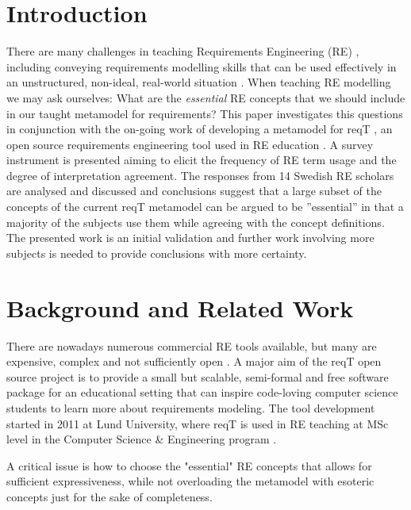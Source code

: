 \documentclass[a4paper]{llncs}
\begin{document}
\section{Introduction}
There are many challenges in teaching Requirements Engineering (RE) \cite{Memon2010, Regev2011}, including  conveying requirements modelling skills that can be used effectively in an unstructured, non-ideal, real-world situation \cite{Callele2006}. When teaching RE modelling we may ask ourselves: What are the \textit{essential} RE concepts that we should include in our taught metamodel for requirements? This paper investigates this questions in conjunction with the on-going work of developing a metamodel for reqT \cite{reqT}, an open source requirements engineering tool \cite{Regnell2013} used in RE education \cite{ets170}.
A survey instrument is presented aiming to elicit the frequency of RE term usage and the degree of interpretation agreement. The responses from 14 Swedish RE scholars are analysed and discussed and conclusions suggest that a large subset of the concepts of the current reqT metamodel can be argued to be ''essential'' in that a majority of the subjects use them while agreeing with the concept definitions. The presented work is an initial validation and further work involving more subjects is needed to provide conclusions with more certainty. 

\section{Background and Related Work}

There are nowadays numerous commercial RE tools available, but many are expensive, complex and not sufficiently open  \cite{Carillo2011}. A major aim of the reqT open source project is to provide a small but scalable, semi-formal and free software package for an educational setting \cite{Regnell2013} that can inspire code-loving computer science students to learn more about requirements modeling. The tool development started in 2011 at Lund University, where reqT is used in RE teaching at MSc level in the Computer Science \& Engineering program \cite{ets170}. 

A critical issue is how to choose the "essential" RE concepts that allows for sufficient expressiveness, while not overloading the metamodel with esoteric concepts just for the sake of completeness. 
\end{document}
